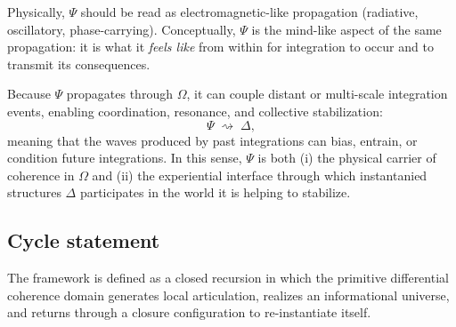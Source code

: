 \documentclass[11pt]{article}
\begin{document}
Physically, $\Psi$ should be read as electromagnetic-like propagation (radiative, oscillatory, phase-carrying).
Conceptually, $\Psi$ is the mind-like aspect of the same propagation: it is what it \emph{feels like} from within
for integration to occur and to transmit its consequences.

Because $\Psi$ propagates through $\Omega$, it can couple distant or multi-scale integration events, enabling
coordination, resonance, and collective stabilization:
\begin{equation}
\label{eq:psi_feedback_to_delta}
\Psi \;\rightsquigarrow\; \Delta,
\end{equation}
meaning that the waves produced by past integrations can bias, entrain, or condition future integrations.
In this sense, $\Psi$ is both (i) the physical carrier of coherence in $\Omega$ and (ii) the experiential interface
through which instantanied structures $\Delta$ participates in the world it is helping to stabilize.


\subsection{Cycle statement}
The framework is defined as a closed recursion in which the primitive differential coherence domain generates local articulation, realizes an informational universe, and returns through a closure configuration to re-instantiate itself.

\end{document}
